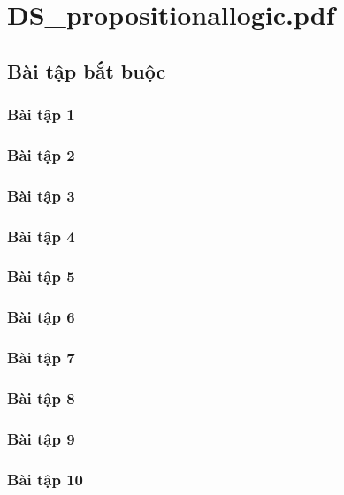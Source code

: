 \documentclass[a4paper]{article}
\begin{document}
\tableofcontents
\newpage
\section{DS\_propositionallogic.pdf}
\subsection{Bài tập bắt buộc}
\subsubsection{Bài tập 1}

\clearpage
\subsubsection{Bài tập 2}

\clearpage
\subsubsection{Bài tập 3}

\clearpage
\subsubsection{Bài tập 4}

\clearpage
\subsubsection{Bài tập 5}

\clearpage
\subsubsection{Bài tập 6}

\clearpage
\subsubsection{Bài tập 7}

\clearpage
\subsubsection{Bài tập 8}

\clearpage
\subsubsection{Bài tập 9}

\clearpage
\subsubsection{Bài tập 10}
\end{document}
